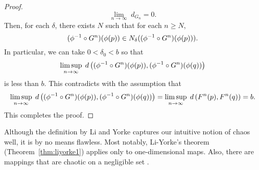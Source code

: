 \documentclass[10pt,draft,twoside]{book}
\begin{document}
\begin{theorem}
\begin{proof}
  \begin{equation*}
    \lim\limits_{n \to \infty}\; d_{G_n} = 0.
  \end{equation*}
  Then, for each $\delta$, there exists $N$ such that for each $n \geq N$,
  \begin{equation*}
    (\phi^{-1} \circ G^n)(\phi(p)) \in N_{\delta}((\phi^{-1} \circ G^n)(\phi(p))).
  \end{equation*}
  In particular, we can take $0 < \delta_0 < b$ so that
  \begin{equation*}
    \limsup\limits_{n \to \infty}\; d\left( (\phi^{-1}\circ G^{n})(\phi(p)) , (\phi^{-1}\circ G^{n})(\phi(q)) \right)
  \end{equation*}
  is less than $b$.
  This contradicts with the assumption that
  \begin{equation*}
    \limsup\limits_{n \to \infty}\; d\left( (\phi^{-1}\circ G^{n})(\phi(p)) , (\phi^{-1}\circ G^{n})(\phi(q)) \right)
    = \limsup\limits_{n \to \infty}\; d\left( F^{n}(p) , F^{n}(q) \right) 
    = b.
    \end{equation*}
  This completes the proof.
  \end{proof}
  \label{thm:liyorke-conj}
\end{theorem}
Although the definition by Li and Yorke captures our intuitive notion of chaos well, it is by no means flawless.
Most notably, Li-Yorke's theorem (Theorem~\ref{thm:liyorke1}) applies only to one-dimensional maps.
Also, there are mappings that are chaotic on a negligible set \citep{martelli}.
\end{document}
